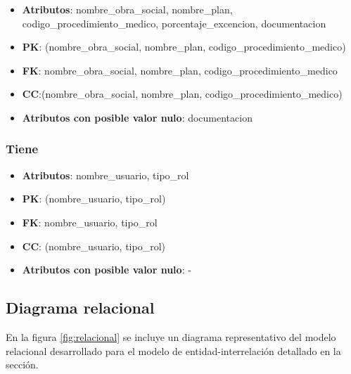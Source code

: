 \documentclass[a4paper,11pt]{article}
\begin{document}
\begin{itemize}

\item 
\textbf{Atributos}: nombre\_obra\_social, nombre\_plan, codigo\_procedimiento\_medico,
porcentaje\_excencion, documentacion

\item 
\textbf{PK}: (nombre\_obra\_social, nombre\_plan, codigo\_procedimiento\_medico)

\item
\textbf{FK}: nombre\_obra\_social, nombre\_plan, codigo\_procedimiento\_medico 

\item 
\textbf{CC}:(nombre\_obra\_social, nombre\_plan, codigo\_procedimiento\_medico)

\item 
\textbf{Atributos con posible valor nulo}: documentacion

\end{itemize}
\subsubsection{\textbf{Tiene}}

\begin{itemize}

\item 
\textbf{Atributos}: nombre\_usuario, tipo\_rol

\item 
\textbf{PK}: (nombre\_usuario, tipo\_rol)

\item
\textbf{FK}: nombre\_usuario, tipo\_rol 

\item 
\textbf{CC}: (nombre\_usuario, tipo\_rol)

\item 
\textbf{Atributos con posible valor nulo}: -

\end{itemize}

\newpage

\subsection{Diagrama relacional}

 En la figura \ref{fig:relacional} se incluye un diagrama representativo del
 modelo relacional desarrollado para el modelo de entidad-interrelación
 detallado en la sección.
\end{document}
